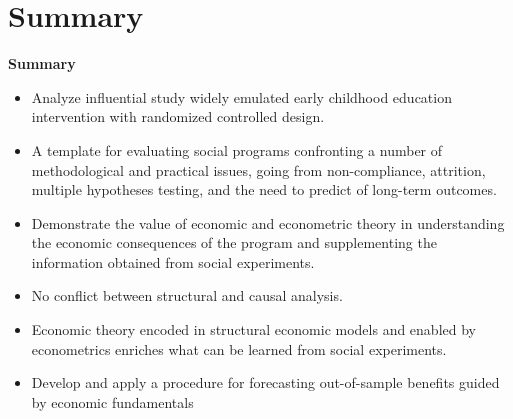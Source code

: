 \documentclass[static]{JJH-Beamer}
\begin{document}
\clearpage

\section{Summary}
\begin{frame}

\begin{block}{}
\begin{center}
\textbf{Summary}
\end{center}
\end{block}

\end{frame}

\begin{frame}

\begin{itemize}
\item Analyze influential study widely emulated early childhood education intervention with randomized controlled design.
\item A template for evaluating social programs confronting a number of methodological and practical issues, going from non-compliance, attrition, multiple hypotheses testing, and the need to predict of long-term outcomes.
\item Demonstrate the value of economic and econometric theory in understanding the economic consequences of the program and supplementing the information obtained from social experiments.
\item No conflict between structural and causal analysis.
\item Economic theory encoded in structural economic models and enabled by econometrics enriches what can be learned from social experiments.
\item Develop and apply a procedure for forecasting out-of-sample benefits guided by economic fundamentals
\end{itemize}

\end{frame}
\end{document}
